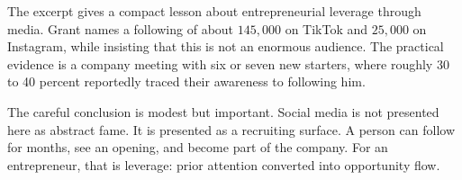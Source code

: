 The excerpt gives a compact lesson about entrepreneurial leverage through media. Grant names a following of about \(145{,}000\) on TikTok and \(25{,}000\) on Instagram, while insisting that this is not an enormous audience. The practical evidence is a company meeting with six or seven new starters, where roughly 30 to 40 percent reportedly traced their awareness to following him.

The careful conclusion is modest but important. Social media is not presented here as abstract fame. It is presented as a recruiting surface. A person can follow for months, see an opening, and become part of the company. For an entrepreneur, that is leverage: prior attention converted into opportunity flow.